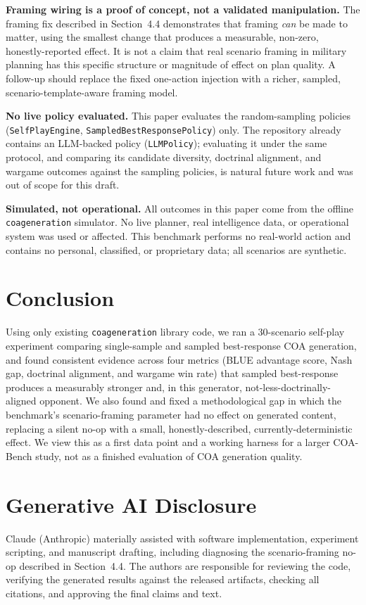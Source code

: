 \documentclass[sigconf]{acmart}
\begin{document}
\textbf{Framing wiring is a proof of concept, not a validated manipulation.} The framing fix described in Section~4.4 demonstrates that framing \emph{can} be made to matter, using the smallest change that produces a measurable, non-zero, honestly-reported effect. It is not a claim that real scenario framing in military planning has this specific structure or magnitude of effect on plan quality. A follow-up should replace the fixed one-action injection with a richer, sampled, scenario-template-aware framing model.

\textbf{No live policy evaluated.} This paper evaluates the random-sampling policies (\texttt{SelfPlayEngine}, \texttt{SampledBestResponsePolicy}) only. The repository already contains an LLM-backed policy (\texttt{LLMPolicy}); evaluating it under the same protocol, and comparing its candidate diversity, doctrinal alignment, and wargame outcomes against the sampling policies, is natural future work and was out of scope for this draft.

\textbf{Simulated, not operational.} All outcomes in this paper come from the offline \texttt{coageneration} simulator. No live planner, real intelligence data, or operational system was used or affected. This benchmark performs no real-world action and contains no personal, classified, or proprietary data; all scenarios are synthetic.

\section{Conclusion}

Using only existing \texttt{coageneration} library code, we ran a 30-scenario self-play experiment comparing single-sample and sampled best-response COA generation, and found consistent evidence across four metrics (BLUE advantage score, Nash gap, doctrinal alignment, and wargame win rate) that sampled best-response produces a measurably stronger and, in this generator, not-less-doctrinally-aligned opponent. We also found and fixed a methodological gap in which the benchmark's scenario-framing parameter had no effect on generated content, replacing a silent no-op with a small, honestly-described, currently-deterministic effect. We view this as a first data point and a working harness for a larger COA-Bench study, not as a finished evaluation of COA generation quality.

\section*{Generative AI Disclosure}
Claude (Anthropic) materially assisted with software implementation, experiment scripting, and manuscript drafting, including diagnosing the scenario-framing no-op described in Section~4.4. The authors are responsible for reviewing the code, verifying the generated results against the released artifacts, checking all citations, and approving the final claims and text.
\end{document}
